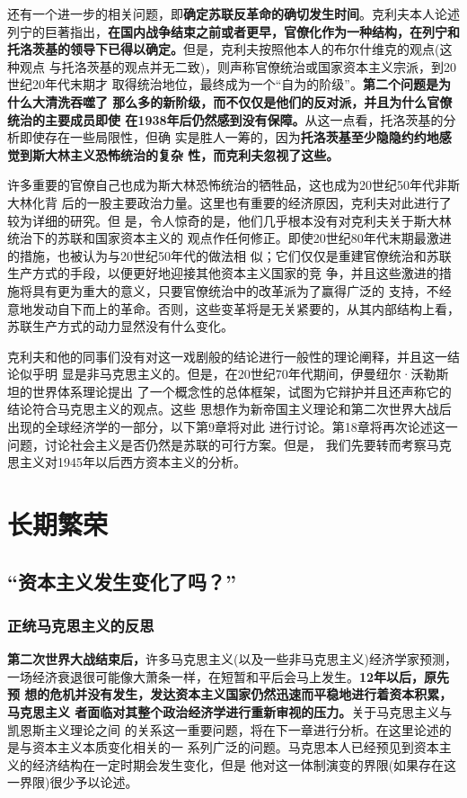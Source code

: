 还有一个进一步的相关问题，即\textbf{确定苏联反革命的确切发生时间}。克利夫本人论述
列宁的巨著指出，\textbf{在国内战争结束之前或者更早，官僚化作为一种结构，在列宁和
  托洛茨基的领导下已得以确定。}但是，克利夫按照他本人的布尔什维克的观点(这种观点
与托洛茨基的观点并无二致)，则声称官僚统治或国家资本主义宗派，到20世纪20年代末期才
取得统治地位，最终成为一个“自为的阶级”。\textbf{第二个问题是为什么大清洗吞噬了
  那么多的新阶级，而不仅仅是他们的反对派，并且为什么官僚统治的主要成员即使
  在1938年后仍然感到没有保障。}从这一点看，托洛茨基的分析即使存在一些局限性，但确
实是胜人一筹的，因为\textbf{托洛茨基至少隐隐约约地感觉到斯大林主义恐怖统治的复杂
  性，而克利夫忽视了这些。}

许多重要的官僚自己也成为斯大林恐怖统治的牺牲品，这也成为20世纪50年代非斯大林化背
后的一股主要政治力量。这里也有重要的经济原因，克利夫对此进行了较为详细的研究。但
是，令人惊奇的是，他们几乎根本没有对克利夫关于斯大林统治下的苏联和国家资本主义的
观点作任何修正。即使20世纪80年代末期最激进的措施，也被认为与20世纪50年代的做法相
似；它们仅仅是重建官僚统治和苏联生产方式的手段，以便更好地迎接其他资本主义国家的竞
争，并且这些激进的措施将具有更为重大的意义，只要官僚统治中的改革派为了赢得广泛的
支持，不经意地发动自下而上的革命。否则，这些变革将是无关紧要的，从其内部结构上看，
苏联生产方式的动力显然没有什么变化。

克利夫和他的同事们没有对这一戏剧般的结论进行一般性的理论阐释，并且这一结论似乎明
显是非马克思主义的。但是，在20世纪70年代期间，伊曼纽尔·沃勒斯坦的世界体系理论提出
了一个概念性的总体框架，试图为它辩护并且还声称它的结论符合马克思主义的观点。这些
思想作为新帝国主义理论和第二次世界大战后出现的全球经济学的一部分，以下第9章将对此
进行讨论。第18章将再次论述这一问题，讨论社会主义是否仍然是苏联的可行方案。但是，
我们先要转而考察马克思主义对1945年以后西方资本主义的分析。


\part{长期繁荣}

\chapter{“资本主义发生变化了吗？”}
\section{正统马克思主义的反思}

\textbf{第二次世界大战结束后，}许多马克思主义(以及一些非马克思主义)经济学家预测，
一场经济衰退很可能像大萧条一样，在短暂和平后会马上发生。\textbf{12年以后，原先预
  想的危机并没有发生，发达资本主义国家仍然迅速而平稳地进行着资本积累，马克思主义
  者面临对其整个政治经济学进行重新审视的压力。}关于马克思主义与凯恩斯主义理论之间
的关系这一重要问题，将在下一章进行分析。在这里论述的是与资本主义本质变化相关的一
系列广泛的问题。马克思本人已经预见到资本主义的经济结构在一定时期会发生变化，但是
他对这一体制演变的界限(如果存在这一界限)很少予以论述。

